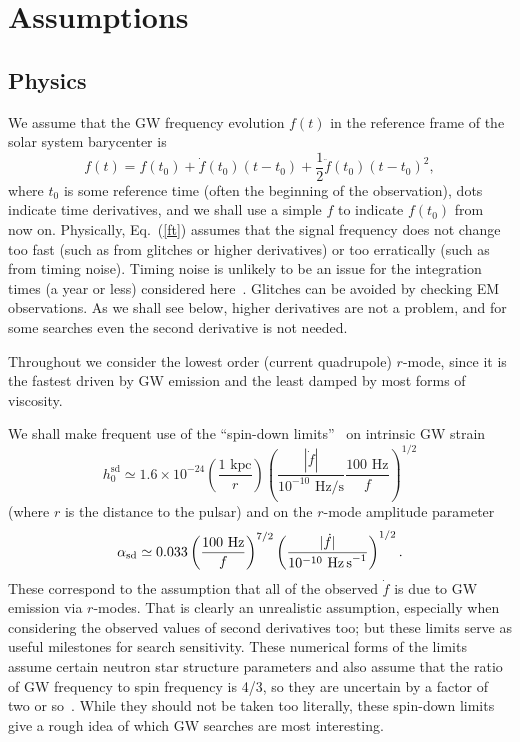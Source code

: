 \documentclass{ttuthes2007}
\begin{document}
\section{Assumptions}

\subsection{Physics}

We assume that the \ac{GW} frequency evolution $f(t)$ in the reference frame
of the solar system barycenter is
\begin{equation}
\label{ft}
f(t) = f\left( t_0 \right) + \dot f\left( t_0 \right) \left( t-t_0 \right) +
\frac{1}{2} \ddot f\left( t_0 \right) \left( t-t_0 \right)^2,
\end{equation}
where $t_0$ is some reference time (often the beginning of the observation),
dots indicate time derivatives, and we shall use a simple $f$ to indicate
$f(t_0)$ from now on.
Physically, Eq.~(\ref{ft}) assumes that the signal frequency does not change
too fast (such as from glitches or higher derivatives) or too erratically
(such as from timing noise).
Timing noise is unlikely to be an issue for the integration times (a year or
less) considered here~\cite{Ashton:2014qya}.
Glitches can be avoided by checking \ac{EM} observations.
As we shall see below, higher derivatives are not a problem, and for some
searches even the second derivative is not needed.

Throughout we consider the lowest order (current quadrupole) $r$-mode, since
it is the fastest driven by \ac{GW} emission and the least damped by most
forms of viscosity.

We shall make frequent use of the ``spin-down limits''~\cite{Owen:2010ng} on
intrinsic \ac{GW} strain~\cite{Jaranowski:1998qm}
\begin{equation}
h_0^\mathrm{sd} \simeq 1.6\times10^{-24} \left( \frac{\mbox{1 kpc}}{r} \right)
\left( \frac{\left|\dot f\right|} {10^{-10}\mbox{ Hz/s}} \frac{\mbox{100 Hz}}
{f} \right)^{1/2}
\label{h0sd}
\end{equation}
(where $r$ is the distance to the pulsar) and on the $r$-mode amplitude
parameter~\cite{LMoO:1998prl}
\begin{equation}
\alpha_\mathrm{sd} \simeq 0.033 \left( \frac{\mbox{100 Hz}} {f} \right)^{7/2}
\left( \frac{|\dot{f}|} {10^{-10}\mbox{ Hz\,s}^{-1}} \right)^{1/2}.
\end{equation}
These correspond to the assumption that all of the observed $\dot f$ is due to
\ac{GW} emission via $r$-modes.
That is clearly an unrealistic assumption, especially when considering the
observed values of second derivatives too; but these limits serve as useful
milestones for search sensitivity.
These numerical forms of the limits assume certain neutron star structure
parameters and also assume that the ratio of \ac{GW} frequency to spin
frequency is 4/3, so they are uncertain by a factor of two or
so~\cite{Owen:2010ng}.
While they should not be taken too literally, these spin-down limits give a
rough idea of which \ac{GW} searches are most interesting.
\end{document}
